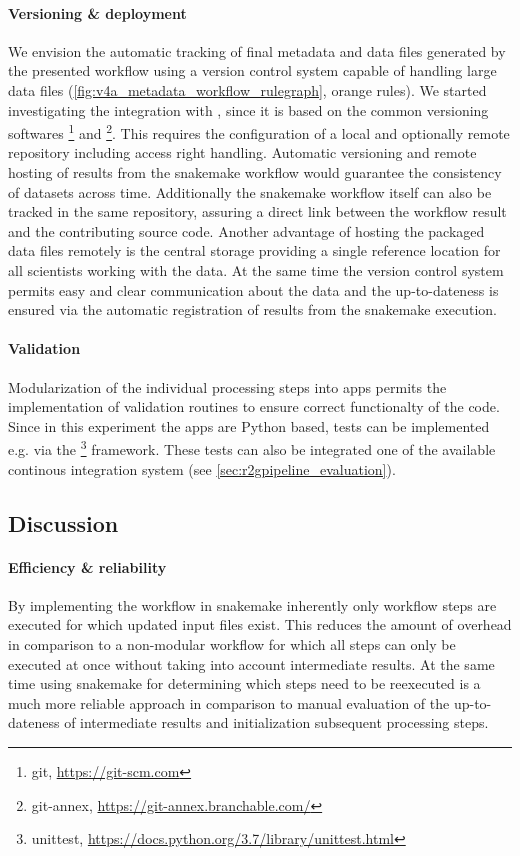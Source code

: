 \paragraph{Versioning \& deployment}
We envision the automatic tracking of final metadata and data files generated by the presented workflow using a version control system capable of handling large data files (\cref{fig:v4a_metadata_workflow_rulegraph}, orange rules). We started investigating the integration with , since it is based on the common versioning softwares \footnote{git, \url{https://git-scm.com}} and \footnote{git-annex, \url{https://git-annex.branchable.com/}}. This requires the configuration of a local and optionally remote repository including access right handling. Automatic versioning and remote hosting of results from the snakemake workflow would guarantee the consistency of datasets across time. Additionally the snakemake workflow itself can also be tracked in the same repository, assuring a direct link between the workflow result and the contributing source code.
Another advantage of hosting the packaged data files remotely is the central storage providing a single reference location for all scientists working with the data. At the same time the version control system permits easy and clear communication about the data and the up-to-dateness is ensured via the automatic registration of results from the snakemake execution.

\paragraph{Validation}
Modularization of the individual processing steps into apps permits the implementation of validation routines to ensure correct functionalty of the code. Since in this experiment the apps are Python based, tests can be implemented e.g. via the \footnote{unittest, \url{https://docs.python.org/3.7/library/unittest.html}} framework. These tests can also be integrated one of the available continous integration system (see \cref{sec:r2gpipeline_evaluation}). 

\subsection{Discussion}
\label{sec:workflow_discussion}
\paragraph{Efficiency \& reliability}
By implementing the workflow in snakemake inherently only workflow steps are executed for which updated input files exist. This reduces the amount of overhead in comparison to a non-modular workflow for which all steps can only be executed at once without taking into account intermediate results.
At the same time using snakemake for determining which steps need to be reexecuted is a much more reliable approach in comparison to manual evaluation of the up-to-dateness of intermediate results and initialization subsequent processing steps.

